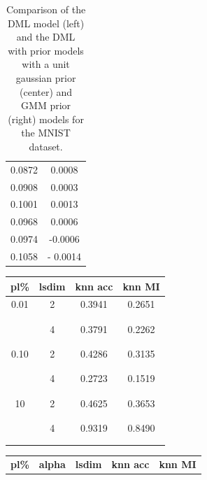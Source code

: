 \documentclass[./dissertation.tex]{subfiles}
\begin{document}
\begin{table}[]
\begin{tabular}{|c|c|}
            0.0872 & 0.0008  \\
            0.0908 & 0.0003  \\
            0.1001 & 0.0013  \\
            0.0968 & 0.0006  \\
            0.0974 & -0.0006  \\
            0.1058 & - 0.0014  \\
            \hline
       \end{tabular}
       \caption{Comparison of the DML model (left) and the DML with prior models with a unit gaussian prior (center) and GMM prior (right) models for the MNIST dataset.\\}
       \label{tab:my_label}
   \end{table}
    
       \begin{table}[]
       \centering
       \small
       \begin{tabular}{|c|c|c|c|}
            \hline
            \textbf{pl\%} & \textbf{lsdim} & \textbf{knn acc} & \textbf{knn MI}  \\
            \hline
            0.01 & 2 & 0.3941 & 0.2651 \\
            & & & \\ 
            & & & \\ 
            & 4 & 0.3791 & 0.2262 \\ 
            & & & \\ 
            & & & \\ 
            0.10 & 2 & 0.4286 & 0.3135 \\
            & & & \\ 
            & & & \\ 
            & 4 & 0.2723 & 0.1519 \\ 
            & & & \\ 
            & & & \\ 
            10 & 2 & 0.4625 & 0.3653 \\
            & & & \\ 
            & & & \\ 
            & 4 & 0.9319 & 0.8490 \\ 
            & & & \\ 
            & & & \\ 
            \hline
       \end{tabular}
        \begin{tabular}{|c|c|c|c|c|}
            \hline
            \textbf{pl\%} & \textbf{alpha} & \textbf{lsdim} & \textbf{knn acc} & \textbf{knn MI}  \\

\end{tabular}
\end{table}
\end{document}
